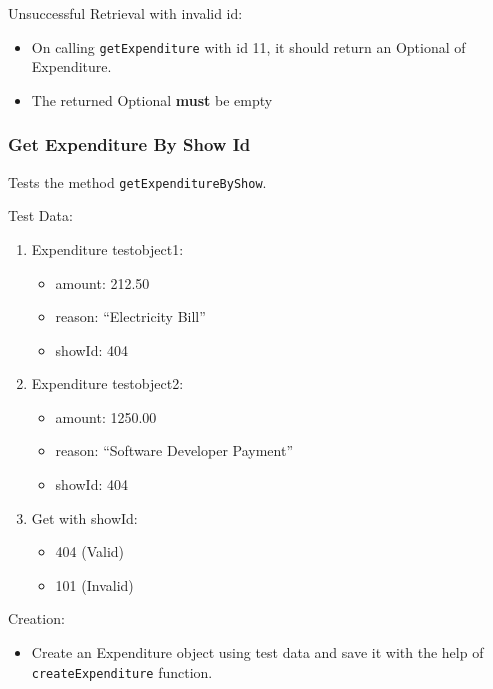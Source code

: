 \documentclass[]{article}
\providecommand{\tightlist}{%
  \setlength{\itemsep}{0pt}\setlength{\parskip}{0pt}}
\begin{document}
Unsuccessful Retrieval with invalid id:

\begin{itemize}
\tightlist
\item
  On calling \texttt{getExpenditure} with id 11, it should return an
  Optional of Expenditure.
\item
  The returned Optional \textbf{must} be empty
\end{itemize}

\hypertarget{get-expenditure-by-show-id}{%
\subsubsection{Get Expenditure By Show
Id}\label{get-expenditure-by-show-id}}

Tests the method \texttt{getExpenditureByShow}.

Test Data:

\begin{enumerate}
\def\labelenumi{\arabic{enumi}.}
\tightlist
\item
  Expenditure testobject1:

  \begin{itemize}
  \tightlist
  \item
    amount: 212.50
  \item
    reason: ``Electricity Bill''
  \item
    showId: 404
  \end{itemize}
\item
  Expenditure testobject2:

  \begin{itemize}
  \tightlist
  \item
    amount: 1250.00
  \item
    reason: ``Software Developer Payment''
  \item
    showId: 404
  \end{itemize}
\item
  Get with showId:

  \begin{itemize}
  \tightlist
  \item
    404 (Valid)
  \item
    101 (Invalid)
  \end{itemize}
\end{enumerate}

Creation:

\begin{itemize}
\tightlist
\item
  Create an Expenditure object using test data and save it with the help
  of \texttt{createExpenditure} function.
\end{itemize}
\end{document}
